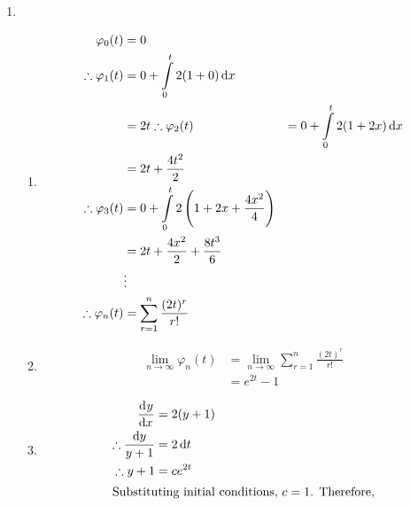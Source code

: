 \documentclass[fleqn, a4paper, 12pt, oneside]{amsart}
\theoremstyle{definition}
\theoremstyle{theorem}
\begin{document}
\begin{solution}
	\begin{enumerate}[label = (\alph*), leftmargin = *]
		\item
			\begin{enumerate}[leftmargin = *]
				\item
					\begin{align*}
						\varphi_0(t)            & = 0                                                                  \\
						\therefore \varphi_1(t) & = 0 + \int\limits_{0}^{t} 2 (1 + 0) \dif x                           \\
                                                                        & = 2 t
						\therefore \varphi_2(t) & = 0 + \int\limits_{0}^{t} 2 (1 + 2 x) \dif x                         \\
                                                                        & = 2 t + \frac{4 t^2}{2}                                              \\
						\therefore \varphi_3(t) & = 0 + \int\limits_{0}^{t} 2 \left( 1 + 2 x + \frac{4 x^2}{4} \right) \\
                                                                        & = 2 t + \frac{4 x^2}{2} + \frac{8 t^3}{6}                            \\
                                                                        & \vdots                                                               \\
						\therefore \varphi_n(t) & = \sum\limits_{r = 1}^{n} \frac{(2 t)^r}{r!}
					\end{align*}
				\item
					\begin{align*}
						\lim\limits_{n \to \infty} \varphi_n(t) & = \lim\limits_{n \to \infty} \sum\limits_{r = 1}^{n} \frac{(2 t)^r}{r!} \\
                                                                                        & = e^{2 t} - 1
					\end{align*}
				\item
					\begin{align*}
						\dod{y}{x}                      & = 2 (y + 1) \\
						\therefore \frac{\dif y}{y + 1} & = 2 \dif t  \\
						\therefore y + 1                & = c e^{2 t} \\
						\intertext{Substituting initial conditions, $c = 1$. Therefore,}

\end{align*}
\end{enumerate}
\end{enumerate}
\end{solution}
\end{document}
